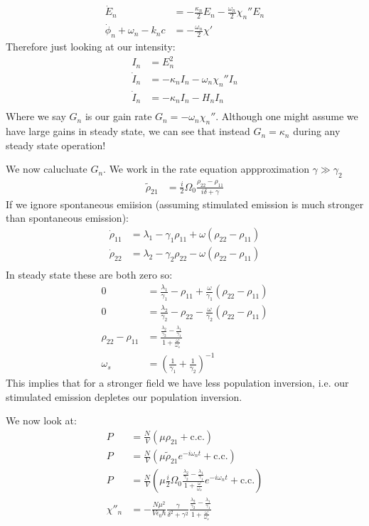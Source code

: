 \begin{align*}
	\dot{E}_n &= -\frac{\kappa_n}{2}E_n - \frac{\omega_n}{2}\chi_n'' E_n \\
	\dot{\phi}_n + \omega_n - k_n c &= -\frac{\omega_n}{2}\chi'
\end{align*}
Therefore just looking at our intensity:
\begin{align*}
	I_n &= E_n^2 \\
	\dot{I}_n &= -\kappa_n I_n -\omega_n\chi_n''I_n \\
	\dot{I}_n &= -\kappa_n I_n -H_n I_n \\
\end{align*}
Where we say $G_n$ is our gain rate $G_n = -\omega_n\chi_n''$. Although one might assume we have large gains in steady state, we can see that instead $G_n = \kappa_n$ during any steady state operation!

We now calucluate $G_n$. We work in the rate equation appproximation $\gamma\gg\gamma_2$
\begin{align*}
	\tilde{\rho}_{21} &= \frac{i}{2}\Omega_0 \frac{\rho_{22} - \rho_{11}}{i\delta + \gamma}
\end{align*}
If we ignore spontaneous emiision (assuming stimulated emission is much stronger than spontaneous emission):
\begin{align*}
	\dot{\rho}_{11} &= \lambda_1 - \gamma_1\rho_{11} + \omega(\rho_{22} - \rho_{11}) \\
	\dot{\rho}_{22} &= \lambda_2 - \gamma_2\rho_{22} - \omega(\rho_{22} - \rho_{11}) \\
\end{align*}
In steady state these are both zero so:
\begin{align*}
	0 &= \frac{\lambda_1}{\gamma_1} - \rho_{11} + \frac{\omega}{\gamma_1}(\rho_{22} - \rho_{11}) \\
	0 &= \frac{\lambda_2}{\gamma_2} - \rho_{22} - \frac{\omega}{\gamma_2}(\rho_{22} - \rho_{11}) \\
	\rho_{22} - \rho_{11} &= \frac{\frac{\lambda_2}{\gamma_2} - \frac{\lambda_1}{\gamma_1}}{1 + \frac{\omega}{\omega_s}} \\
	\omega_s &= \left(\frac{1}{\gamma_1} + \frac{1}{\gamma_2}\right)^{-1}
\end{align*}
This implies that for a stronger field we have less population inversion, i.e. our stimulated emission depletes our population inversion.

We now look at:
\begin{align*}
	P &= \frac{N}{V}(\mu\rho_{21} + \text{c.c.}) \\
	P &= \frac{N}{V}(\mu\tilde{\rho}_{21}e^{-i\omega_n t} + \text{c.c.}) \\
	P &= \frac{N}{V}(\mu \frac{i}{2}\Omega_0\frac{\frac{\lambda_2}{\gamma_2} - \frac{\lambda_1}{\gamma_1}}{1 + \frac{\omega}{\omega_s}} e^{-i\omega_n t} + \text{c.c.}) \\
	\chi''_n &= -\frac{N\mu^2}{V\epsilon_0\hbar} \frac{\gamma}{\delta^2+\gamma^2} \frac{\frac{\lambda_2}{\gamma_2} - \frac{\lambda_1}{\gamma_1}}{1 + \frac{\omega}{\omega_s}}
\end{align*}
